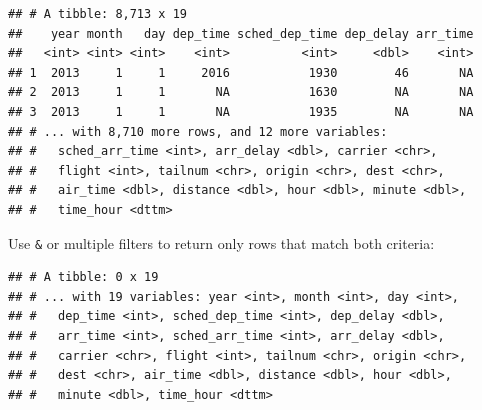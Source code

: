 \documentclass[]{book}
\newenvironment{Shaded}{}{}
\newcommand{\DecValTok}[1]{#1}
\newcommand{\KeywordTok}[1]{\textcolor[rgb]{0.00,0.00,1.00}{#1}}
\newcommand{\NormalTok}[1]{#1}
\newcommand{\OperatorTok}[1]{#1}
\newcommand{\StringTok}[1]{\textcolor[rgb]{0.00,0.50,0.50}{#1}}
\begin{document}
\begin{Shaded}
\end{Shaded}

\begin{verbatim}
## # A tibble: 8,713 x 19
##    year month   day dep_time sched_dep_time dep_delay arr_time
##   <int> <int> <int>    <int>          <int>     <dbl>    <int>
## 1  2013     1     1     2016           1930        46       NA
## 2  2013     1     1       NA           1630        NA       NA
## 3  2013     1     1       NA           1935        NA       NA
## # ... with 8,710 more rows, and 12 more variables:
## #   sched_arr_time <int>, arr_delay <dbl>, carrier <chr>,
## #   flight <int>, tailnum <chr>, origin <chr>, dest <chr>,
## #   air_time <dbl>, distance <dbl>, hour <dbl>, minute <dbl>,
## #   time_hour <dttm>
\end{verbatim}

Use \texttt{\&} or multiple filters to return only rows that match both criteria:

\begin{Shaded}
\end{Shaded}

\begin{verbatim}
## # A tibble: 0 x 19
## # ... with 19 variables: year <int>, month <int>, day <int>,
## #   dep_time <int>, sched_dep_time <int>, dep_delay <dbl>,
## #   arr_time <int>, sched_arr_time <int>, arr_delay <dbl>,
## #   carrier <chr>, flight <int>, tailnum <chr>, origin <chr>,
## #   dest <chr>, air_time <dbl>, distance <dbl>, hour <dbl>,
## #   minute <dbl>, time_hour <dttm>
\end{verbatim}

\begin{Shaded}
\end{Shaded}
\end{document}
